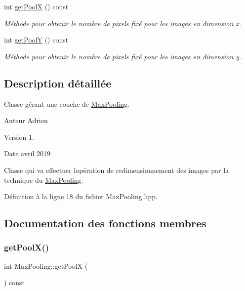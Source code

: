 \begin{DoxyCompactItemize}
int \hyperlink{class_max_pooling_aa794b6174d54f2be8e6eed4ab09365e9}{get\+PoolX} () const
\begin{DoxyCompactList}\small\item\em Méthode pour obtenir le nombre de pixels fixé pour les images en dimension x. \end{DoxyCompactList}\item 
int \hyperlink{class_max_pooling_a7c72e57c8a90e18804b288f28fde7af0}{get\+PoolY} () const
\begin{DoxyCompactList}\small\item\em Méthode pour obtenir le nombre de pixels fixé pour les images en dimension y. \end{DoxyCompactList}\end{DoxyCompactItemize}


\subsection{Description détaillée}
Classe gérant une couche de \hyperlink{class_max_pooling}{Max\+Pooling}. 

\begin{DoxyAuthor}{Auteur}
Adrien 
\end{DoxyAuthor}
\begin{DoxyVersion}{Version}
1. 
\end{DoxyVersion}
\begin{DoxyDate}{Date}
avril 2019
\end{DoxyDate}
Classe qui va effectuer l\textquotesingle{}opération de redimensionnement des images par la technique du \hyperlink{class_max_pooling}{Max\+Pooling}. 

Définition à la ligne 18 du fichier Max\+Pooling.\+hpp.



\subsection{Documentation des fonctions membres}
\mbox{\label{class_max_pooling_aa794b6174d54f2be8e6eed4ab09365e9}} 
\subsubsection{\texorpdfstring{get\+Pool\+X()}{getPoolX()}}
{\footnotesize\ttfamily int Max\+Pooling\+::get\+PoolX (\begin{DoxyParamCaption}{ }\end{DoxyParamCaption}) const}



